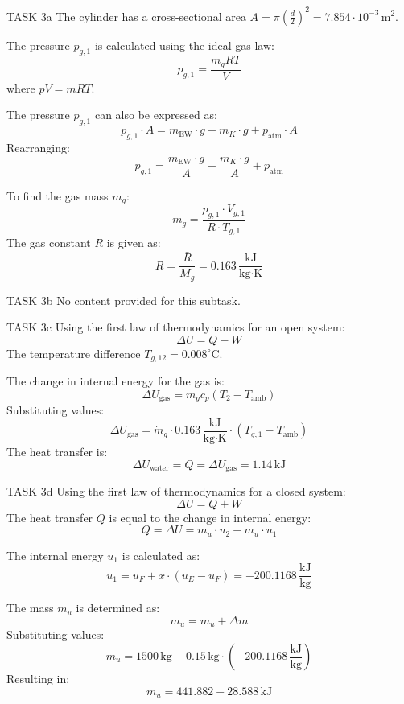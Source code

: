 TASK 3a  
The cylinder has a cross-sectional area \( A = \pi \left( \frac{d}{2} \right)^2 = 7.854 \cdot 10^{-3} \, \text{m}^2 \).  

The pressure \( p_{g,1} \) is calculated using the ideal gas law:  
\[
p_{g,1} = \frac{m_g R T}{V}
\]  
where \( pV = mRT \).  

The pressure \( p_{g,1} \) can also be expressed as:  
\[
p_{g,1} \cdot A = m_{\text{EW}} \cdot g + m_K \cdot g + p_{\text{atm}} \cdot A
\]  
Rearranging:  
\[
p_{g,1} = \frac{m_{\text{EW}} \cdot g}{A} + \frac{m_K \cdot g}{A} + p_{\text{atm}}
\]  

To find the gas mass \( m_g \):  
\[
m_g = \frac{p_{g,1} \cdot V_{g,1}}{R \cdot T_{g,1}}
\]  
The gas constant \( R \) is given as:  
\[
R = \frac{\bar{R}}{M_g} = 0.163 \, \frac{\text{kJ}}{\text{kg·K}}
\]  

TASK 3b  
No content provided for this subtask.  

TASK 3c  
Using the first law of thermodynamics for an open system:  
\[
\Delta U = Q - W
\]  
The temperature difference \( T_{g,12} = 0.008^\circ\text{C} \).  

The change in internal energy for the gas is:  
\[
\Delta U_{\text{gas}} = m_g c_p (T_2 - T_{\text{amb}})
\]  
Substituting values:  
\[
\Delta U_{\text{gas}} = \dot{m}_g \cdot 0.163 \, \frac{\text{kJ}}{\text{kg·K}} \cdot (T_{g,1} - T_{\text{amb}})
\]  
The heat transfer is:  
\[
\Delta U_{\text{water}} = Q = \Delta U_{\text{gas}} = 1.14 \, \text{kJ}
\]  

TASK 3d  
Using the first law of thermodynamics for a closed system:  
\[
\Delta U = Q + W
\]  
The heat transfer \( Q \) is equal to the change in internal energy:  
\[
Q = \Delta U = m_u \cdot u_2 - m_u \cdot u_1
\]  

The internal energy \( u_1 \) is calculated as:  
\[
u_1 = u_F + x \cdot (u_E - u_F) = -200.1168 \, \frac{\text{kJ}}{\text{kg}}
\]  

The mass \( m_u \) is determined as:  
\[
m_u = m_u + \Delta m
\]  
Substituting values:  
\[
m_u = 1500 \, \text{kg} + 0.15 \, \text{kg} \cdot (-200.1168 \, \frac{\text{kJ}}{\text{kg}})
\]  
Resulting in:  
\[
m_u = 441.882 - 28.588 \, \text{kJ}
\]  